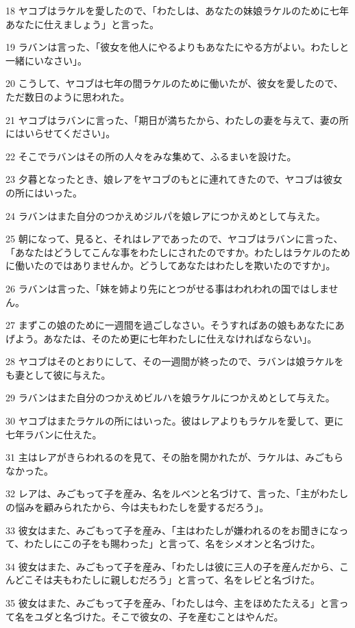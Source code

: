 \par 18 ヤコブはラケルを愛したので、「わたしは、あなたの妹娘ラケルのために七年あなたに仕えましょう」と言った。
\par 19 ラバンは言った、「彼女を他人にやるよりもあなたにやる方がよい。わたしと一緒にいなさい」。
\par 20 こうして、ヤコブは七年の間ラケルのために働いたが、彼女を愛したので、ただ数日のように思われた。
\par 21 ヤコブはラバンに言った、「期日が満ちたから、わたしの妻を与えて、妻の所にはいらせてください」。
\par 22 そこでラバンはその所の人々をみな集めて、ふるまいを設けた。
\par 23 夕暮となったとき、娘レアをヤコブのもとに連れてきたので、ヤコブは彼女の所にはいった。
\par 24 ラバンはまた自分のつかえめジルパを娘レアにつかえめとして与えた。
\par 25 朝になって、見ると、それはレアであったので、ヤコブはラバンに言った、「あなたはどうしてこんな事をわたしにされたのですか。わたしはラケルのために働いたのではありませんか。どうしてあなたはわたしを欺いたのですか」。
\par 26 ラバンは言った、「妹を姉より先にとつがせる事はわれわれの国ではしません。
\par 27 まずこの娘のために一週間を過ごしなさい。そうすればあの娘もあなたにあげよう。あなたは、そのため更に七年わたしに仕えなければならない」。
\par 28 ヤコブはそのとおりにして、その一週間が終ったので、ラバンは娘ラケルをも妻として彼に与えた。
\par 29 ラバンはまた自分のつかえめビルハを娘ラケルにつかえめとして与えた。
\par 30 ヤコブはまたラケルの所にはいった。彼はレアよりもラケルを愛して、更に七年ラバンに仕えた。
\par 31 主はレアがきらわれるのを見て、その胎を開かれたが、ラケルは、みごもらなかった。
\par 32 レアは、みごもって子を産み、名をルベンと名づけて、言った、「主がわたしの悩みを顧みられたから、今は夫もわたしを愛するだろう」。
\par 33 彼女はまた、みごもって子を産み、「主はわたしが嫌われるのをお聞きになって、わたしにこの子をも賜わった」と言って、名をシメオンと名づけた。
\par 34 彼女はまた、みごもって子を産み、「わたしは彼に三人の子を産んだから、こんどこそは夫もわたしに親しむだろう」と言って、名をレビと名づけた。
\par 35 彼女はまた、みごもって子を産み、「わたしは今、主をほめたたえる」と言って名をユダと名づけた。そこで彼女の、子を産むことはやんだ。

